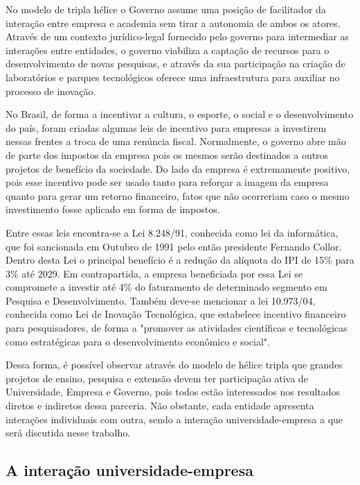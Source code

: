 No modelo de tripla hélice o Governo assume uma posição de facilitador da interação entre empresa e academia sem tirar a autonomia de ambos os atores. Através de um contexto jurídico-legal fornecido pelo governo para intermediar as interações entre entidades, o governo viabiliza a captação de recursos para o desenvolvimento de novas pesquisas, e através da sua participação na criação de laboratórios e parques tecnológicos oferece uma infraestrutura para  auxiliar no processo de inovação.

No Brasil, de forma a incentivar a cultura, o esporte, o social e o desenvolvimento do país, foram criadas algumas leis de incentivo para empresas a investirem nessas frentes a troca de uma renúncia fiscal.  Normalmente, o governo abre mão de parte dos impostos da empresa pois os mesmos serão destinados a outros projetos de benefício da sociedade. Do lado da empresa é extremamente positivo, pois esse incentivo pode ser usado tanto para reforçar a imagem da empresa quanto para gerar um retorno financeiro, fatos que não ocorreriam caso o mesmo investimento fosse aplicado em forma de impostos.

Entre essas leis encontra-se a Lei 8.248/91, conhecida como lei da informática, que foi sancionada em Outubro de 1991 pelo então presidente Fernando Collor. Dentro desta Lei o principal benefício é a redução da alíquota do IPI de 15\% para 3\% até 2029. Em contrapartida, a empresa beneficiada por essa Lei se compromete a investir até 4\% do faturamento de determinado segmento em Pesquisa e Desenvolvimento. Também deve-se mencionar a lei 10.973/04, conhecida como Lei de Inovação Tecnológica, que estabelece incentivo financeiro para pesquisadores, de forma a "promover as atividades científicas e tecnológicas como estratégicas para o desenvolvimento econômico e social".

Dessa forma, é possível observar através do modelo de hélice tripla que grandes projetos de ensino, pesquisa e extensão devem ter participação ativa de Universidade, Empresa e Governo, pois todos estão interessados nos resultados diretos e indiretos dessa parceria. Não obstante, cada entidade apresenta interações individuais com outra, sendo a interação universidade-empresa a que será discutida nesse trabalho.

\subsection{A interação universidade-empresa}
\label{cha:univ_empresa}

